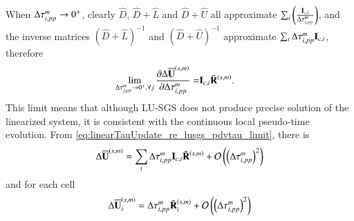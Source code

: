 When $\mathrm\Delta\tau^m_{i,pp}\rightarrow 0^+$, clearly 
$\hat D $, $\hat D + \hat L$ and $\hat D + \hat U$ all 
approximate
$\sum_i\left(\frac{\mathbf{I}_{c,i}}{\mathrm\Delta \tau^m_{i,pp}}\right) $,
and the inverse matrices  $(\hat D + \hat L)^{-1}$ and 
$(\hat D + \hat U)^{-1}$ approximate $\sum_i\mathrm\Delta\tau^m_{i,pp}\mathbf{I}_{c,i}$,
therefore
\begin{equation}
    \begin{aligned}
       \lim_{\mathrm\Delta\tau^m_{j,pp}\rightarrow 0^+, \forall j}\pdv{\mathrm\Delta\overline{\mathbf{U}}^{\left(s,m\right)}}{\mathrm\Delta\tau^m_{i,pp}}
    = & \mathbf{I}_{c,i}
    \tilde{\mathbf{R}}^{\left(s,m\right)}.
    \end{aligned}
    \label{eq:linearTauUpdate_re_lusgs_pdvtau_limit}
\end{equation}
This limit means that although LU-SGS does not 
produce precise solution of the linearized system, 
it is consistent with the continuous local pseudo-time evolution. 
From \eqref{eq:linearTauUpdate_re_lusgs_pdvtau_limit},
there is 
\begin{equation}
    \mathrm\Delta \overline{\mathbf{U}}^{\left(s,m\right)}
    =
    \sum_i{\mathrm\Delta\tau^m_{i,pp}\mathbf{I}_{c,i}} \tilde{\mathbf{R}}^{\left(s,m\right)}
    +
    \mathcal{O}\left(\left(\mathrm\Delta\tau^m_{i,pp}\right)^2\right)
\end{equation}
and for each cell
\begin{equation}
\label{eq:linearTauUpdate_lusgs_expand_tau}
    \mathrm\Delta \overline{\mathbf{U}}^{\left(s,m\right)}_i
    =
    \mathrm\Delta\tau^m_{i,pp}
    \tilde{\mathbf{R}}^{\left(s,m\right)}_i
    +
    \mathcal{O}\left(\left(\mathrm\Delta\tau^m_{i,pp}\right)^2\right)
\end{equation}

